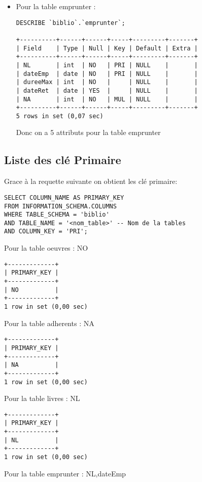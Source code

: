 \documentclass[11]{article}
\begin{document}
\begin{itemize}
	\item Pour la table emprunter :
	      \begin{verbatim}
DESCRIBE `biblio`.`emprunter`;

+----------+------+------+-----+---------+-------+
| Field    | Type | Null | Key | Default | Extra |
+----------+------+------+-----+---------+-------+
| NL       | int  | NO   | PRI | NULL    |       |
| dateEmp  | date | NO   | PRI | NULL    |       |
| dureeMax | int  | NO   |     | NULL    |       |
| dateRet  | date | YES  |     | NULL    |       |
| NA       | int  | NO   | MUL | NULL    |       |
+----------+------+------+-----+---------+-------+
5 rows in set (0,07 sec)
\end{verbatim}
	      Donc on a 5 attributs pour la table emprunter
\end{itemize}
\subsection{Liste des clé Primaire}

Grace à la requette suivante on obtient les clé primaire:

\begin{verbatim}
SELECT COLUMN_NAME AS PRIMARY_KEY
FROM INFORMATION_SCHEMA.COLUMNS
WHERE TABLE_SCHEMA = 'biblio'
AND TABLE_NAME = '<nom_table>' -- Nom de la tables
AND COLUMN_KEY = 'PRI';
\end{verbatim}

Pour la table oeuvres : NO

\begin{verbatim}
+-------------+
| PRIMARY_KEY |
+-------------+
| NO          |
+-------------+
1 row in set (0,00 sec)
\end{verbatim}

Pour la table adherents : NA

\begin{verbatim}
+-------------+
| PRIMARY_KEY |
+-------------+
| NA          |
+-------------+
1 row in set (0,00 sec)
\end{verbatim}

Pour la table livres : NL

\begin{verbatim}
+-------------+
| PRIMARY_KEY |
+-------------+
| NL          |
+-------------+
1 row in set (0,00 sec)
\end{verbatim}

Pour la table emprunter : NL,dateEmp
\end{document}

